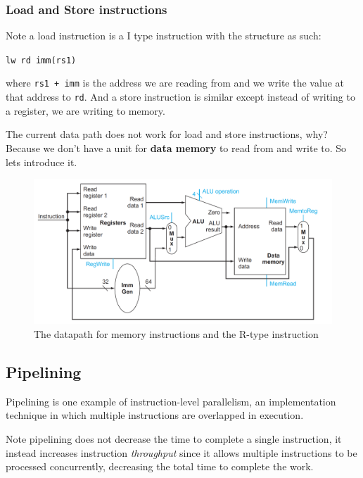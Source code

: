 \documentclass[12pt]{article}
\begin{document}
\subsubsection*{Load and Store instructions}
Note a load instruction is a I type instruction with the structure as such:

\lstinline{lw rd imm(rs1)}

where \lstinline{rs1 + imm} is the address we are reading from and we write the value at that address to \lstinline{rd}. And a store instruction is similar except instead of writing to a register, we are writing to memory.

The current data path does not work for load and store instructions, why? Because we don't have a unit for \textbf{data memory} to read from and write to. So lets introduce it.

\begin{figure}[h]
    \centering
    \includegraphics[scale=0.35]{images/memory-instructions-datapath.png}
    \caption{The datapath for memory instructions and the R-type instruction}
\end{figure}
\subsection*{Pipelining}
\begin{definition}[Pipelining]
    Pipelining is one example of instruction-level parallelism, an implementation technique in which multiple instructions are overlapped in execution.
\end{definition}

Note pipelining does not decrease the time to complete a single instruction, it instead increases instruction  \emph{throughput} since it allows multiple instructions to be processed concurrently, decreasing the total time to complete the work.
\end{document}
